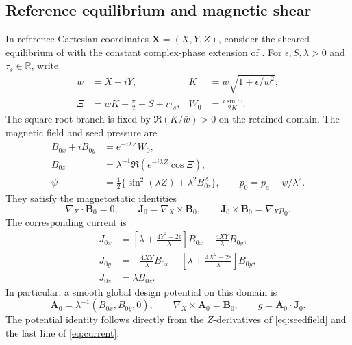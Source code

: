 \documentclass[11pt,a4paper]{article}
\theoremstyle{remark}\newtheorem{remark}{Remark}
\numberwithin{equation}{section}
\newcommand{\BB}{\boldsymbol B}
\newcommand{\JJ}{\boldsymbol J}
\newcommand{\Avec}{\boldsymbol A}
\newcommand{\XX}{\boldsymbol X}
\newcommand{\grad}{\nabla}
\begin{document}
\subsection{Reference equilibrium and magnetic shear}
In reference Cartesian coordinates $\XX=(X,Y,Z)$, consider the sheared equilibrium of \citet{Landreman} with the constant complex-phase extension of \citet{Issan}. For $\epsilon,S,\lambda>0$ and $\tau_s\in\mathbb R$, write
\begin{equation}
\begin{aligned}
w&=X+iY,&K&=\bar w\sqrt{1+\epsilon/\bar w^2},\\
\Xi&=wK+\frac\pi2-S+i\tau_s,&W_0&=\frac{i\sin\Xi}{2K}.
\end{aligned}
\label{eq:complexseed}
\end{equation}
The square-root branch is fixed by $\Re(K/\bar w)>0$ on the retained domain. The magnetic field and seed pressure are
\begin{equation}
\begin{aligned}
B_{0x}+iB_{0y}&=e^{-i\lambda Z}W_0,\\
B_{0z}&=\lambda^{-1}\Re(e^{-i\lambda Z}\cos\Xi),\\
\psi&=\tfrac12\{\sin^2(\lambda Z)+\lambda^2B_{0z}^2\},
\qquad p_0=p_a-\psi/\lambda^2.
\end{aligned}
\label{eq:seedfield}
\end{equation}
They satisfy the magnetostatic identities
\begin{equation}
\grad_X\!\cdot\BB_0=0,\qquad
\JJ_0=\grad_X\!\times\BB_0,\qquad
\JJ_0\times\BB_0=\grad_Xp_0.
\label{eq:mhs}
\end{equation}
The corresponding current is
\begin{equation}
\begin{aligned}
J_{0x}&=\left[\lambda+\frac{4Y^2-2\epsilon}{\lambda}\right]B_{0x}
-\frac{4XY}{\lambda}B_{0y},\\
J_{0y}&=-\frac{4XY}{\lambda}B_{0x}
+\left[\lambda+\frac{4X^2+2\epsilon}{\lambda}\right]B_{0y},\\
J_{0z}&=\lambda B_{0z}.
\end{aligned}
\label{eq:current}
\end{equation}
In particular, a smooth global design potential on this domain is
\begin{equation}
\Avec_0=\lambda^{-1}(B_{0x},B_{0y},0),\qquad
\grad_X\!\times\Avec_0=\BB_0,
\qquad g=\Avec_0\cdot\JJ_0.
\label{eq:designpotential}
\end{equation}
The potential identity follows directly from the $Z$-derivatives of \eqref{eq:seedfield} and the last line of \eqref{eq:current}.
\end{document}
